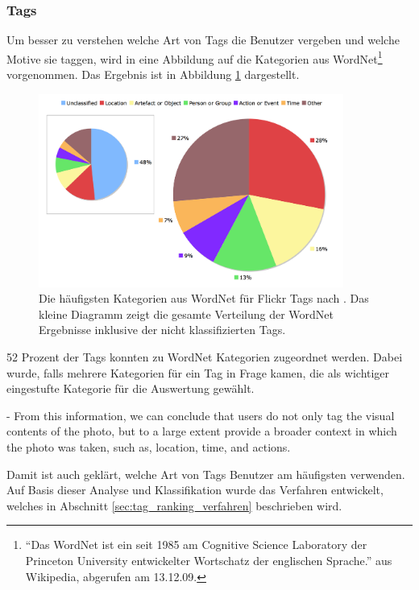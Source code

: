 \subsubsection*{Tags} %
\label{ssub:tags}


Um besser zu verstehen welche Art von Tags die Benutzer vergeben und welche Motive sie taggen, wird in \cite{collectiveKnowledge} eine Abbildung auf die Kategorien aus WordNet\footnote{``Das WordNet ist ein seit 1985 am Cognitive Science Laboratory der Princeton University entwickelter Wortschatz der englischen Sprache.'' aus Wikipedia, abgerufen am 13.12.09.} vorgenommen. Das Ergebnis ist in Abbildung \ref{fig:collectiveKnowledge_word_net_categories} dargestellt.

\begin{figure}[htbp]
  \centering
    \includegraphics[height=2.5in]{images/collectiveKnowledge_word_net_categories.png}
  \caption{Die häufigsten Kategorien aus WordNet für Flickr Tags nach \cite{collectiveKnowledge}. Das kleine Diagramm zeigt die gesamte Verteilung der WordNet Ergebnisse inklusive der nicht klassifizierten Tags.}
  \label{fig:collectiveKnowledge_word_net_categories}
\end{figure}

52 Prozent der Tags konnten zu WordNet Kategorien zugeordnet werden. Dabei wurde, falls mehrere Kategorien für ein Tag in Frage kamen, die als wichtiger eingestufte Kategorie für die Auswertung gewählt. 

- From this information, we can conclude that users do not only tag the visual contents of the photo, but to a large extent provide a broader context in which the photo was taken, such as, location, time, and actions.

Damit ist auch geklärt, welche Art von Tags Benutzer am häufigsten verwenden. Auf Basis dieser Analyse und Klassifikation wurde das Verfahren entwickelt, welches in Abschnitt \ref{sec:tag_ranking_verfahren} beschrieben wird.





